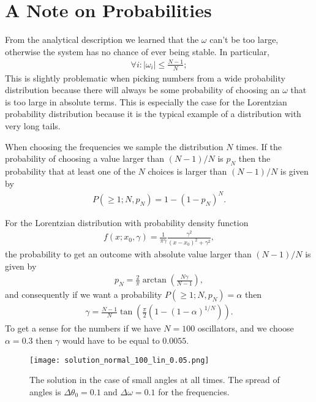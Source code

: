 \documentclass[10pt,a4paper,twocolumn]{article}
\begin{document}
\section{A Note on Probabilities}

From the analytical description we learned that the $\omega$ can't be too large, otherwise the system has no chance of ever being stable. In particular,
%
\begin{align}\label{eq:leq1_cond}
    \forall i: |\omega_i| \leq \frac{N - 1}{N};
\end{align}
%
This is slightly problematic when picking numbers from a wide probability distribution because there will always be some probability of choosing an $\omega$ that is too large in absolute terms. This is especially the case for the Lorentzian probability distribution because it is the typical example of a distribution with very long tails.

When choosing the frequencies we sample the distribution $N$ times. If the probability of choosing a value larger than $(N-1)/N$ is $p_N$ then the probability that at least one of the $N$ choices is larger than $(N - 1)/N$ is given by
%
\begin{align}
    P(\geq 1; N, p_N) = 1 - (1 - p_N)^N.
\end{align}

For the Lorentzian distribution with probability density function
%
\begin{align}
    f(x; x_0, \gamma) = \frac{1}{\pi \gamma} \frac{\gamma^2}{(x - x_0)^2 + \gamma^2},
\end{align}
%
the probability to get an outcome with absolute value larger than $(N - 1)/N$ is given by
%
\begin{align}
    p_N = \frac{2}{\pi} \arctan \left(\frac{N \gamma}{N - 1}\right),
\end{align}
%
and consequently if we want a probability $P(\geq 1; N, p_N) = \alpha$ then
%
\begin{align}
    \gamma = \frac{N - 1}{N} \tan \left(\frac{\pi}{2} \left(1 - (1 - \alpha)^{1/N}\right)\right).
\end{align}
%
To get a sense for the numbers if we have $N = 100$ oscillators, and we choose $\alpha = 0.3$ then $\gamma$ would have to be equal to $0.0055$.

\begin{figure}[!b]
    \centering
    \texttt{[image: solution\_normal\_100\_lin\_0.05.png]}
    \caption{The solution in the case of small angles at all times. The spread of angles is $\Delta \theta_0 = 0.1$ and $\Delta \omega = 0.1$ for the frequencies.}
    \label{fig:100_smalls}
\end{figure}
\end{document}
